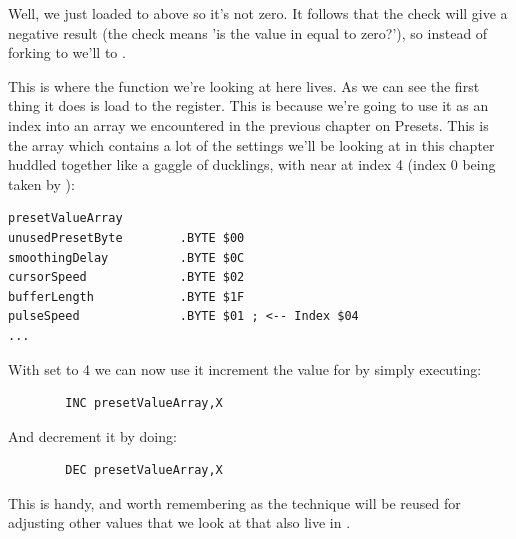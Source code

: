 Well, we just loaded  to  above so it's not zero.  It follows that
the  check will give a negative result (the check means 'is the value in  equal to zero?'), 
so instead of forking to  we'll  to .

This is where the function we're looking at here lives. As we can see the first thing it does is load 
 to the  register. This is because we're going to use it as an index
into an array we encountered in the previous chapter on Presets. This is the array 
which contains a lot of the settings we'll be looking at in this chapter huddled together like a gaggle
of ducklings, with  near at index 4 (index 0 being taken by ):

\begin{lstlisting}
presetValueArray
unusedPresetByte        .BYTE $00
smoothingDelay          .BYTE $0C
cursorSpeed             .BYTE $02
bufferLength            .BYTE $1F
pulseSpeed              .BYTE $01 ; <-- Index $04
...
\end{lstlisting}

With  set to 4 we can now use it increment the value for  by
simply executing:
\begin{lstlisting}
        INC presetValueArray,X
\end{lstlisting}
And decrement it by doing:
\begin{lstlisting}
        DEC presetValueArray,X
\end{lstlisting}
This is handy, and worth remembering as the technique will be reused for adjusting other values that 
we look at that also live in .

\clearpage

